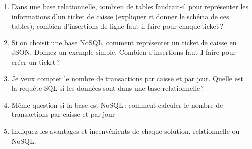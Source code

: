 \documentclass[11pt,a4paper]{article}
\begin{document}
\begin{enumerate}
  \item Dans une base relationnelle, combien de tables faudrait-il pour représenter 
         les informations d'un ticket de caisse (expliquer et donner le schéma de ces tables); combien d'insertions de ligne
             faut-il faire pour chaque ticket\,?
    \item Si on choisit une base NoSQL, comment représenter un ticket de caisse en JSON.
        Donnez un exemple simple. Combien d'insertions faut-il faire pour créer un ticket\,?
   \item Je veux compter le nombre de transactions par caisse et par jour.  Quelle est la requête SQL si les données
       sont dans une base relationnelle\,?
    \item Même question si la base est NoSQL\,: comment calculer le nombre de transactions par caisse et par jour
    \item Indiquez les avantages et inconvénients de chaque solution, relationnelle ou NoSQL.
 \end{enumerate}
\end{document}
